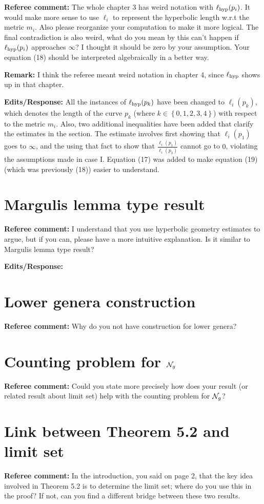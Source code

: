 \documentclass[12pt, reqno]{amsart}
\begin{document}
\textbf{Referee comment:} The whole chapter 3 has weird notation with $\ell_{\mathrm{hyp}}(p_i)$. It would make more sense to use $\ell_i$ to represent the hyperbolic length w.r.t the metric $m_i$.
Also please reorganize your computation to make it more logical. The final contradiction is also weird, what do you mean by this can't happen if $\ell_{\mathrm{hyp}}(p_i)$ approaches $\infty$? I thought it should be zero by your assumption. Your equation (18) should be interpreted algebraically in a better way.

\textbf{Remark:} I think the referee meant weird notation in chapter 4, since $\ell_{\mathrm{hyp}}$ shows up in that chapter.

\textbf{Edits/Response:} All the instances of $\ell_{\mathrm{hyp}}(p_k)$ have been changed to $\ell_i(p_k)$, which denotes the length of the curve $p_k$ (where $k \in \left\{ 0, 1, 2, 3, 4 \right\}$) with respect to the metric $m_i$.
Also, two additional inequalities have been added that clarify the estimates in the section. The estimate involves first showing that $\ell_i(p_1)$ goes to $\infty$, and the using that fact to show that $\frac{\ell_i(p_1)}{\ell_i(p_3)}$ cannot go to $0$, violating the assumptions made in case I.
Equation (17) was added to make equation (19) (which was previously (18)) easier to understand.

\section{Margulis lemma type result}
\label{sec:margulis-lemma-type}

\textbf{Referee comment:} I understand that you use hyperbolic geometry estimates to argue, but if you can, please have a more intuitive explanation. Is it similar to Margulis lemma type result?

\textbf{Edits/Response:}

\section{Lower genera construction}
\label{sec:lower-genera-constr}

\textbf{Referee comment:} Why do you not have construction for lower genera?

\section{Counting problem for $\mathcal{N}_g$}
\label{sec:counting-problem}

\textbf{Referee comment:} Could you state more precisely how does your result (or related result about limit set) help with the counting problem for $\mathcal{N}_g$?

\section{Link between Theorem 5.2 and limit set}
\label{sec:link-between-theorem}

\textbf{Referee comment:} In the introduction, you said on page 2, that the key idea involved in Theorem 5.2 is to determine the limit set; where do you use this in the proof? If not, can you find a different bridge between these two results.
\end{document}
